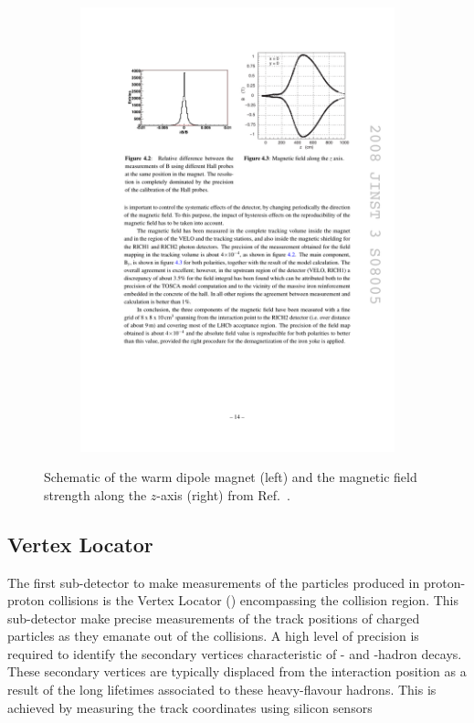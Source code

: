 \begin{figure}[!h]
\begin{subfigure}[t]{0.4\textwidth}
        \centering
        \includegraphics[width=1.0\textwidth]{figs/Detector/magnet_B_field.pdf}
    \end{subfigure}
    \caption{Schematic of the \lhcb warm dipole magnet (left) and the magnetic field strength along the $z$-axis (right) from Ref.~\cite{Alves:2008zz}.}
    \label{fig:Dec_magnet}   
\end{figure}


\subsection{Vertex Locator}

The first sub-detector to make measurements of the particles produced in proton-proton collisions is the Vertex Locator (\velo) encompassing the collision region. This sub-detector make precise measurements of the track positions of charged particles as they emanate out of the collisions. A high level of precision is required to identify the secondary vertices characteristic of \bquark- and \cquark-hadron decays. These secondary vertices are typically displaced from the interaction position as a result of the long lifetimes associated to these heavy-flavour hadrons. This is achieved by measuring the track coordinates using silicon sensors 


